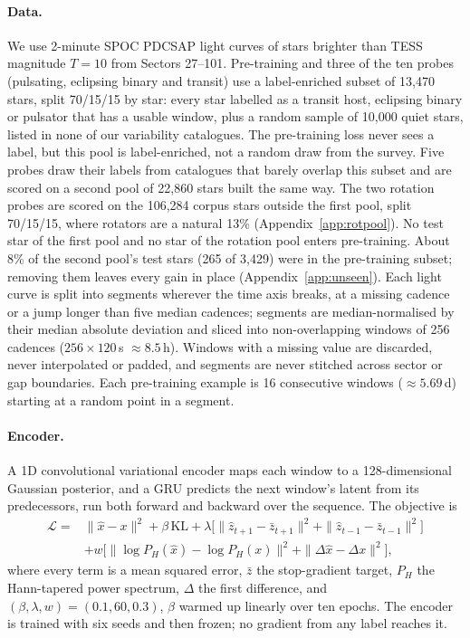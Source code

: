 \documentclass{article}
\begin{document}
\paragraph{Data.} We use 2-minute SPOC PDCSAP light curves of stars brighter than TESS magnitude
$T = 10$ from Sectors 27--101. Pre-training and three of the ten probes (pulsating, eclipsing
binary and transit) use a label-enriched subset of 13{,}470 stars, split 70/15/15
by star: every star labelled as a transit host, eclipsing binary or pulsator that has a usable
window, plus a random sample of 10{,}000 quiet stars, listed in none of our variability catalogues. The pre-training
loss never sees a label, but this pool is label-enriched, not a random draw from the survey. Five probes draw their labels from catalogues that barely overlap this subset and are scored on a second pool of 22{,}860 stars built the same way. The two rotation probes are scored
on the 106{,}284 corpus stars outside the first pool, split 70/15/15, where rotators are a natural
13\% (Appendix~\ref{app:rotpool}). No test star of the first pool and no star of the rotation pool
enters pre-training. About 8\% of the second pool's test stars (265 of 3{,}429) were in the pre-training subset; removing them leaves every gain in place
(Appendix~\ref{app:unseen}). Each light curve is split into segments wherever the time axis
breaks, at a missing cadence or a jump longer than five median cadences; segments are
median-normalised by their median absolute deviation and sliced into non-overlapping windows of 256
cadences ($256 \times 120$\,s $\approx 8.5$\,h). Windows with a missing value are discarded, never interpolated or padded,
and segments are never stitched across sector or gap boundaries. Each pre-training example is 16
consecutive windows ($\approx 5.69$\,d) starting at a random point in a segment.

\paragraph{Encoder.} A 1D convolutional variational encoder \citep{kingma2014} maps each window to a
128-dimensional Gaussian posterior, and a GRU \citep{cho2014} predicts the next window's latent from
its predecessors, run both forward and backward over the sequence. The objective is
\begin{align*}
\mathcal{L} = {} & \|\hat{x}-x\|^{2} + \beta\,\mathrm{KL}
+ \lambda\big[\|\hat{z}_{t+1}-\bar{z}_{t+1}\|^{2} + \|\hat{z}_{t-1}-\bar{z}_{t-1}\|^{2}\big] \\
& + w\big[\|\log P_{H}(\hat{x})-\log P_{H}(x)\|^{2} + \|\Delta\hat{x}-\Delta x\|^{2}\big],
\end{align*}
where every term is a mean squared error, $\bar{z}$ the stop-gradient target, $P_{H}$ the Hann-tapered power spectrum, $\Delta$ the first difference, and
$(\beta,\lambda,w) = (0.1, 60, 0.3)$, $\beta$ warmed up linearly over ten epochs. The encoder is trained with six seeds and then frozen; no gradient from any label reaches
it.
\end{document}
